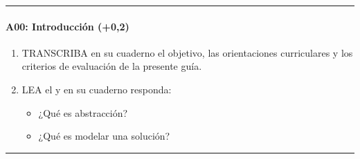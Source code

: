 \documentclass[letterpaper,10pt,spanish]{sphinxmanual}
\begin{document}
\bigskip\hrule\bigskip



\paragraph{A00: Introducción (+0,2)}
\label{\detokenize{cursos/ofimatica11/periodo01/G03:a00-introduccion-0-2}}
\sphinxAtStartPar
{}
\begin{enumerate}
%
\item {} 
\sphinxAtStartPar
TRANSCRIBA en su cuaderno el objetivo, las orientaciones curriculares y los criterios de evaluación de la presente guía.

\item {} 
\sphinxAtStartPar
LEA el  y en su cuaderno responda:
\begin{itemize}
\item {} 
\sphinxAtStartPar
¿Qué es abstracción?

\item {} 
\sphinxAtStartPar
¿Qué es modelar una solución?

\end{itemize}

\end{enumerate}


\bigskip\hrule\bigskip
\end{document}
